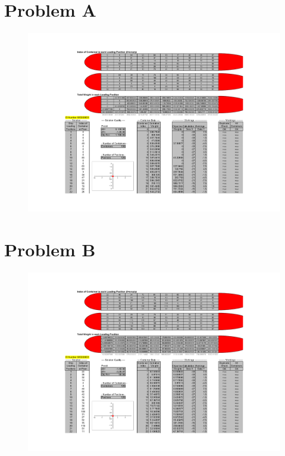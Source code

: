 \documentclass[10pt,a4paper]{article}
\begin{document}
\newpage
\thispagestyle{plain}
\section*{Problem A}
\begin{figure}[H]
	\centering
	\includegraphics[width=1.6\linewidth, angle=90, origin=c]{ProbA.pdf}
\end{figure}

\newpage
\thispagestyle{plain}
\section*{Problem B}
\begin{figure}[H]
	\centering
	\includegraphics[width=1.6\linewidth, angle=90, origin=c]{ProbB.pdf}
\end{figure}
\end{document}
